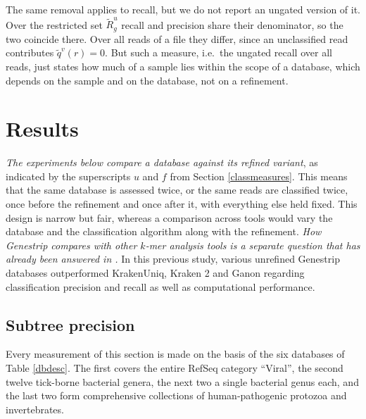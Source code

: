 \documentclass[pdflatex,sn-vancouver-num]{sn-jnl}
\begin{document}
    The same removal applies to recall, but we do not report an ungated version of it. Over the restricted set $\widetilde{R}^u_g$ recall and precision share their denominator, so the two coincide there. Over all reads of a file they differ, since an unclassified read contributes $\tilde{q}^v(r) = 0$. But such a measure, i.e.\ the ungated recall over all reads, just states how much of a sample lies within the scope of a database, which depends on the sample and on the database, not on a refinement.

\section{Results}\label{results}

    \emph{The experiments below compare a database against its refined variant}, as indicated by the superscripts $u$ and $f$ from Section \ref{classmeasures}. This means that the same database is assessed twice, or the same reads are classified twice, once before the refinement and once after it, with everything else held fixed. This design is narrow but fair, whereas a comparison across tools would vary the database and the classification algorithm along with the refinement. \emph{How Genestrip compares with other $k$-mer analysis tools is a separate question that has already been answered in \citep{genestrip-pub}.} In this previous study, various unrefined Genestrip databases outperformed KrakenUniq, Kraken 2 and Ganon regarding classification precision and recall as well as computational performance.
    
    \subsection{Subtree precision}

    Every measurement of this section is made on the basis of the six databases of Table \ref{dbdesc}. The first covers the entire RefSeq category \enquote{Viral}, the second twelve tick-borne bacterial genera, the next two a single bacterial genus each, and the last two form comprehensive collections of human-pathogenic protozoa and invertebrates.
\end{document}
